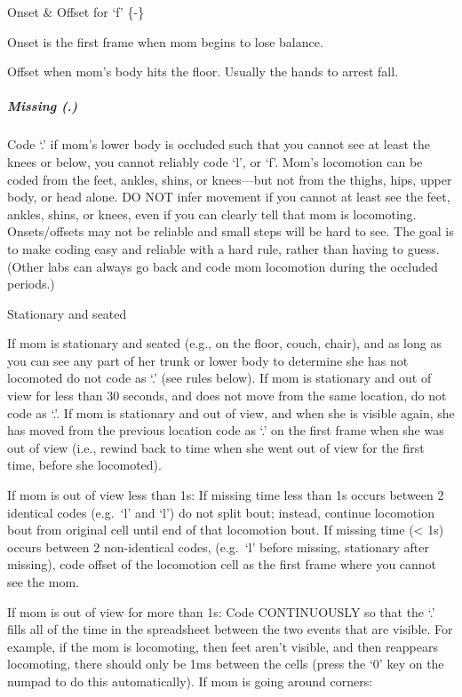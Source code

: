\documentclass[
  12pt,
]{book}
\begin{document}
Onset \& Offset for `f' \{-\}

Onset is the first frame when mom begins to lose balance.

Offset when mom's body hits the floor. Usually the hands to arrest fall.

\hypertarget{mom_missing}{%
\subparagraph*{Missing (.)}\label{mom_missing}}

Code `.' if mom's lower body is occluded such that you cannot see at least the knees or below, you cannot reliably code `l', or `f'. Mom's locomotion can be coded from the feet, ankles, shins, or knees---but not from the thighs, hips, upper body, or head alone. DO NOT infer movement if you cannot at least see the feet, ankles, shins, or knees, even if you can clearly tell that mom is locomoting. Onsets/offsets may not be reliable and small steps will be hard to see. The goal is to make coding easy and reliable with a hard rule, rather than having to guess. (Other labs can always go back and code mom locomotion during the occluded periods.)

Stationary and seated

If mom is stationary and seated (e.g., on the floor, couch, chair), and as long as you can see any part of her trunk or lower body to determine she has not locomoted do not code as `.' (see rules below). If mom is stationary and out of view for less than 30 seconds, and does not move from the same location, do not code as `.'. If mom is stationary and out of view, and when she is visible again, she has moved from the previous location code as `.' on the first frame when she was out of view (i.e., rewind back to time when she went out of view for the first time, before she locomoted).

If mom is out of view less than 1s: If missing time less than 1s occurs between 2 identical codes (e.g.~`l' and `l') do not split bout; instead, continue locomotion bout from original cell until end of that locomotion bout.
If missing time (\textless{} 1s) occurs between 2 non-identical codes, (e.g.~`l' before missing, stationary after missing), code offset of the locomotion cell as the first frame where you cannot see the mom.

If mom is out of view for more than 1s: Code CONTINUOUSLY so that the `.' fills all of the time in the spreadsheet between the two events that are visible. For example, if the mom is locomoting, then feet aren't visible, and then reappears locomoting, there should only be 1ms between the cells (press the `0' key on the numpad to do this automatically).
If mom is going around corners:
\end{document}
